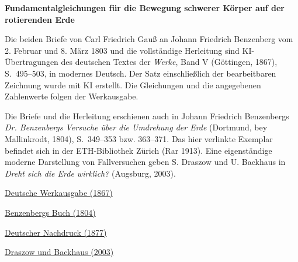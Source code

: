 \clearpage
\thispagestyle{empty}
\begin{center}\Large\textbf{Fundamentalgleichungen für die Bewegung schwerer Körper auf der rotierenden Erde}\end{center}

Die beiden Briefe von Carl Friedrich Gauß an Johann Friedrich Benzenberg vom 2. Februar und 8. März 1803 und die vollständige Herleitung sind KI-Übertragungen des deutschen Textes der \textit{Werke}, Band V (Göttingen, 1867), S.~495--503, in modernes Deutsch. Der Satz einschließlich der bearbeitbaren Zeichnung wurde mit KI erstellt. Die Gleichungen und die angegebenen Zahlenwerte folgen der Werkausgabe.

Die Briefe und die Herleitung erschienen auch in Johann Friedrich Benzenbergs \textit{Dr. Benzenbergs Versuche über die Umdrehung der Erde} (Dortmund, bey Mallinkrodt, 1804), S.~349--353 bzw. 363--371. Das hier verlinkte Exemplar befindet sich in der ETH-Bibliothek Zürich (Rar 1913). Eine eigenständige moderne Darstellung von Fallversuchen geben S. Draszow und U. Backhaus in \textit{Dreht sich die Erde wirklich?} (Augsburg, 2003).

\medskip\noindent
\href{https://gdz.sub.uni-goettingen.de/id/PPN236006339}{Deutsche Werkausgabe (1867)}\par
\noindent\href{https://doi.org/10.3931/e-rara-14813}{Benzenbergs Buch (1804)}\par
\noindent\href{https://doi.org/10.1007/978-3-642-49319-5_23}{Deutscher Nachdruck (1877)}\par
\noindent\href{https://www.didaktik.physik.uni-due.de/backhaus/publicat/FallversucheDPG.pdf}{Draszow und Backhaus (2003)}
\clearpage
